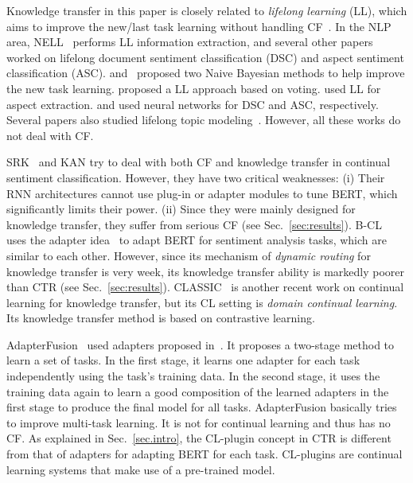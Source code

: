 \documentclass{article}
\begin{document}
Knowledge transfer in this paper is closely related to \textit{lifelong learning} (LL), which aims to improve the new/last task learning without handling CF~\cite{Silver2013,ruvolo2013ella,chen2018lifelong}. 
In the NLP area, NELL~\cite{carlson2010toward} performs LL information extraction, and several other papers worked on lifelong document sentiment classification (DSC) and aspect sentiment classification (ASC). 
\cite{DBLP:conf/acl/ChenM015} and~\cite{hao2019forward} proposed two Naive Bayesian methods to help improve the new task learning.
\cite{xia2017distantly} proposed a LL approach based on voting. \cite{ShuXuLiu2017} used LL for aspect extraction. \cite{qin2020using} and \cite{shuai2018lifelong} used neural networks for DSC and ASC, respectively. {\color{black}Several papers also studied lifelong topic modeling~\cite{chen2018lifelong,gupta2020neural}.} However, all these works do not deal with CF.

{\color{black}SRK~\cite{DBLP:conf/dasfaa/LvWLCZ19} and KAN \cite{ke2020continual} try to deal with both CF and knowledge transfer in continual sentiment classification. However, they have two critical weaknesses: (i) Their RNN architectures cannot use plug-in or adapter modules to tune BERT, which significantly limits their power. (ii) Since they were mainly designed for knowledge transfer, they suffer from serious CF (see Sec.~\ref{sec:results}).  B-CL~\cite{ke2021adapting} uses the adapter idea~\cite{Houlsby2019Parameter} to adapt BERT for sentiment analysis tasks, which are similar to each other. However, since its mechanism of \textit{dynamic routing} for knowledge transfer is very week, its knowledge transfer ability is markedly poorer than CTR (see Sec.~\ref{sec:results}).  CLASSIC~\cite{ke2021Classic} is another recent work on continual learning for knowledge transfer, but its CL setting is \textit{domain continual learning}. Its knowledge transfer method is based on contrastive learning.}








{\color{black}AdapterFusion~\cite{pfeiffer2020adapterfusion} used adapters proposed in~\cite{Houlsby2019Parameter}. It proposes a two-stage method to learn a set of tasks. In the first stage, it learns one adapter for each task independently using the task’s training data. In the second stage, it uses the training data again to learn a good composition of the learned adapters in the first stage to produce the final model for all tasks. AdapterFusion basically tries to improve multi-task learning. It is not for continual learning and thus has no CF. As explained in Sec.~\ref{sec.intro}, the CL-plugin concept in CTR is different from that of adapters for adapting BERT for each task. CL-plugins are continual learning systems that make use of a pre-trained model. }
\end{document}
